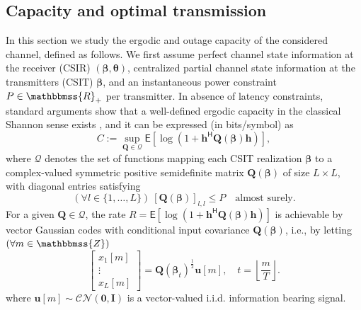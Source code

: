 \documentclass[10pt,journal,a4paper]{IEEEtran}
\newcommand{\E}{\mathsf{E}}		%
\newcommand{\stdset}[1]{\mathbbmss{#1}}	%
\newcommand{\set}[1]{\mathcal{#1}}		%
\renewcommand{\vec}[1]{\bm{#1}}		%
\newcommand{\CN}{\mathcal{CN}}			%
\newcommand{\herm}{\mathsf{H}}			%
\begin{document}
\subsection{Capacity and optimal transmission}
In this section we study the ergodic and outage capacity of the considered channel, defined as follows. We first assume perfect channel state information at the receiver (CSIR) $(\vec{\beta},\vec{\theta})$, centralized
partial channel state information at the transmitters (CSIT) $\vec{\beta}$, and an instantaneous power constraint $P\in \stdset{R}_{+}$ per transmitter. In absence of latency constraints, standard arguments show that a well-defined ergodic capacity in the classical Shannon sense exists \cite{caire1999capacity}, and it can be expressed (in bits/symbol) as 
\begin{equation*}
C := \sup_{\vec{Q}\in \set{Q}}\E[\log(1+\vec{h}^\herm \vec{Q}(\vec{\beta}) \vec{h})],
\end{equation*}
where $\set{Q}$ denotes the set of functions mapping each CSIT realization $\vec{\beta}$ to a complex-valued symmetric positive semidefinite matrix $\vec{Q}(\vec{\beta})$ of size $L\times L$, with diagonal entries satisfying 
\begin{equation*}
(\forall l \in \{1,\ldots,L\})~[\vec{Q}(\vec{\beta})]_{l,l} \leq P \quad \text{almost surely}.
\end{equation*} 
For a given $\vec{Q}\in \set{Q}$, the rate $R = \E[\log(1+\vec{h}^\herm \vec{Q}(\vec{\beta}) \vec{h})]$ is achievable by vector Gaussian codes with conditional input covariance $\vec{Q}(\vec{\beta})$, i.e., by letting $(\forall m \in \stdset{Z})$
\begin{equation}\label{eq:tx_signal}
\begin{bmatrix}
x_1[m] \\
\vdots \\
x_L[m] 
\end{bmatrix} = \vec{Q}(\vec{\beta}_t)^{\frac{1}{2}}\vec{u}[m], \quad t=\left\lfloor \frac{m}{T}\right\rfloor.
\end{equation}
where $\vec{u}[m] \sim \CN(\vec{0},\vec{I})$ is a vector-valued i.i.d. information bearing signal. 
\end{document}
